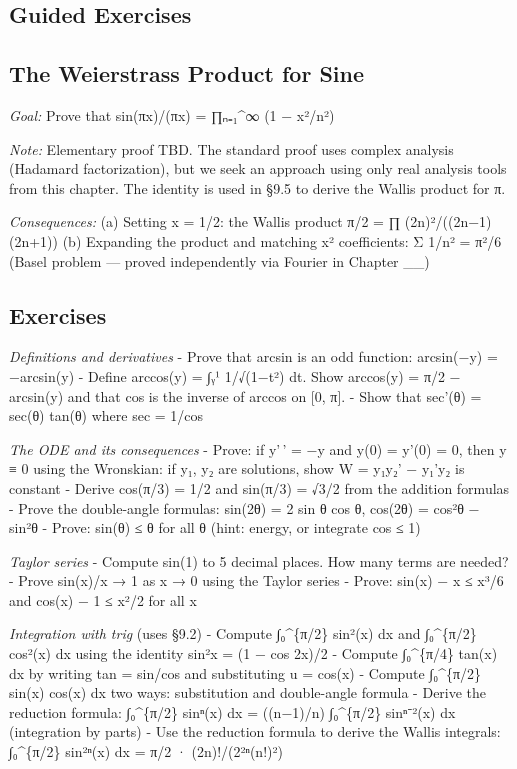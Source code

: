 \documentclass[
  10pt,
  letterpaper,
]{scrbook}
\begin{document}
\subsection{Guided Exercises}\label{guided-exercises-22}

\subsection{The Weierstrass Product for
Sine}\label{the-weierstrass-product-for-sine}

\emph{Goal:} Prove that sin(πx)/(πx) = ∏ₙ₌₁\^{}∞ (1 − x²/n²)

\emph{Note:} Elementary proof TBD. The standard proof uses complex
analysis (Hadamard factorization), but we seek an approach using only
real analysis tools from this chapter. The identity is used in §9.5 to
derive the Wallis product for π.

\emph{Consequences:} (a) Setting x = 1/2: the Wallis product π/2 = ∏
(2n)²/((2n−1)(2n+1)) (b) Expanding the product and matching x²
coefficients: Σ 1/n² = π²/6 (Basel problem --- proved independently via
Fourier in Chapter \_\_)

\subsection{Exercises}\label{exercises-41}

\emph{Definitions and derivatives} - Prove that arcsin is an odd
function: arcsin(−y) = −arcsin(y) - Define arccos(y) = ∫ᵧ¹ 1/√(1−t²) dt.
Show arccos(y) = π/2 − arcsin(y) and that cos is the inverse of arccos
on {[}0, π{]}. - Show that sec'(θ) = sec(θ) tan(θ) where sec = 1/cos

\emph{The ODE and its consequences} - Prove: if y'\,' = −y and y(0) =
y'(0) = 0, then y ≡ 0 using the Wronskian: if y₁, y₂ are solutions, show
W = y₁y₂' − y₁'y₂ is constant - Derive cos(π/3) = 1/2 and sin(π/3) =
√3/2 from the addition formulas - Prove the double-angle formulas:
sin(2θ) = 2 sin θ cos θ, cos(2θ) = cos²θ − sin²θ - Prove:
\textbar sin(θ)\textbar{} ≤ \textbar θ\textbar{} for all θ (hint:
energy, or integrate \textbar cos\textbar{} ≤ 1)

\emph{Taylor series} - Compute sin(1) to 5 decimal places. How many
terms are needed? - Prove sin(x)/x → 1 as x → 0 using the Taylor series
- Prove: \textbar sin(x) − x\textbar{} ≤ \textbar x\textbar³/6 and
\textbar cos(x) − 1\textbar{} ≤ x²/2 for all x

\emph{Integration with trig} (uses §9.2) - Compute ∫₀\^{}\{π/2\} sin²(x)
dx and ∫₀\^{}\{π/2\} cos²(x) dx using the identity sin²x = (1 − cos
2x)/2 - Compute ∫₀\^{}\{π/4\} tan(x) dx by writing tan = sin/cos and
substituting u = cos(x) - Compute ∫₀\^{}\{π/2\} sin(x) cos(x) dx two
ways: substitution and double-angle formula - Derive the reduction
formula: ∫₀\^{}\{π/2\} sinⁿ(x) dx = ((n−1)/n) ∫₀\^{}\{π/2\} sinⁿ⁻²(x) dx
(integration by parts) - Use the reduction formula to derive the Wallis
integrals: ∫₀\^{}\{π/2\} sin²ⁿ(x) dx = π/2 · (2n)!/(2²ⁿ(n!)²)
\end{document}
